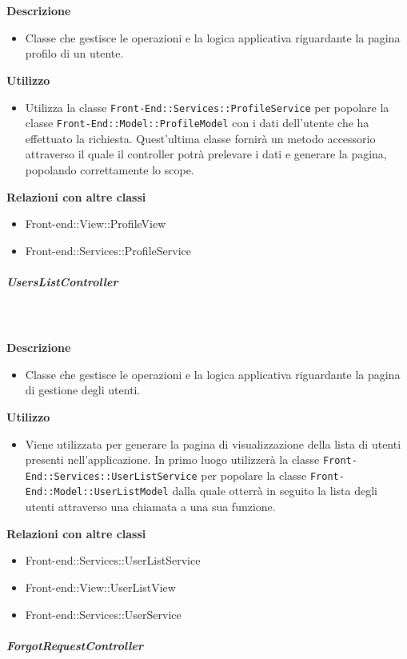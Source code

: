 				\textbf{\\ \\ Descrizione} 
					\begin{itemize}
						\item[] Classe che gestisce le operazioni e la logica applicativa riguardante la pagina profilo di un utente.
					\end{itemize}      
				\textbf{Utilizzo}  
					\begin{itemize}
						\item[] Utilizza la classe \texttt{Front-End::Services::ProfileService} per popolare la classe \texttt{Front-End::Model::ProfileModel} con i dati dell'utente che ha effettuato la richiesta. Quest'ultima classe fornirà un metodo accessorio attraverso il quale il controller potrà prelevare i dati e generare la pagina, popolando correttamente lo scope.
					\end{itemize}
					\textbf{Relazioni con altre classi}
					\begin{itemize}
							\item{Front-end::View::ProfileView}
							\item{Front-end::Services::ProfileService}
					\end{itemize}
			\subparagraph{UsersListController}
				
				\textbf{\\ \\ Descrizione} 
					\begin{itemize}
						\item[] Classe che gestisce le operazioni e la logica applicativa riguardante la pagina di gestione degli utenti.
					\end{itemize}      
				\textbf{Utilizzo}  
					\begin{itemize}
						\item[] Viene utilizzata per generare la pagina di visualizzazione della lista di utenti presenti nell'applicazione. In primo luogo utilizzerà la classe \texttt{Front-End::Services::UserListService} per popolare la classe \texttt{Front-End::Model::UserListModel} dalla quale otterrà in seguito la lista degli utenti attraverso una chiamata a una sua funzione.
					\end{itemize}
					\textbf{Relazioni con altre classi}
					\begin{itemize}
							\item{Front-end::Services::UserListService}
							\item{Front-end::View::UserListView}
							\item{Front-end::Services::UserService}
					\end{itemize}
			\subparagraph{ForgotRequestController}
				
